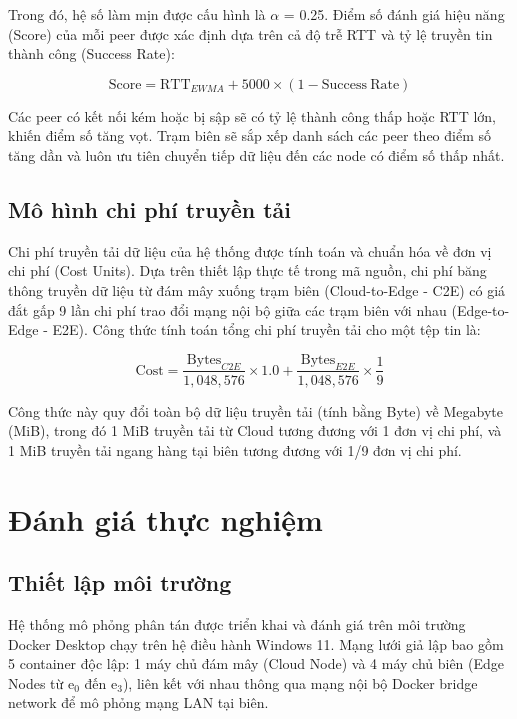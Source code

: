 \documentclass[11pt,a4paper]{article}
\begin{document}
Trong đó, hệ số làm mịn được cấu hình là \ensuremath{\alpha} = 0.25. Điểm số đánh giá hiệu năng (Score) của mỗi peer được xác định dựa trên cả độ trễ RTT và tỷ lệ truyền tin thành công (Success Rate):

\[\mathrm{Score}=\mathrm{RTT}_{EWMA}+5000\times(1-\mathrm{Success\ Rate})\]

Các peer có kết nối kém hoặc bị sập sẽ có tỷ lệ thành công thấp hoặc RTT lớn, khiến điểm số tăng vọt. Trạm biên sẽ sắp xếp danh sách các peer theo điểm số tăng dần và luôn ưu tiên chuyển tiếp dữ liệu đến các node có điểm số thấp nhất.

\subsection{Mô hình chi phí truyền tải}

Chi phí truyền tải dữ liệu của hệ thống được tính toán và chuẩn hóa về đơn vị chi phí (Cost Units). Dựa trên thiết lập thực tế trong mã nguồn, chi phí băng thông truyền dữ liệu từ đám mây xuống trạm biên (Cloud-to-Edge - C2E) có giá đắt gấp 9 lần chi phí trao đổi mạng nội bộ giữa các trạm biên với nhau (Edge-to-Edge - E2E). Công thức tính toán tổng chi phí truyền tải cho một tệp tin là:

\[\mathrm{Cost}=\frac{\mathrm{Bytes}_{C2E}}{1{,}048{,}576}\times1.0+\frac{\mathrm{Bytes}_{E2E}}{1{,}048{,}576}\times\frac{1}{9}\]

Công thức này quy đổi toàn bộ dữ liệu truyền tải (tính bằng Byte) về Megabyte (MiB), trong đó 1 MiB truyền tải từ Cloud tương đương với 1 đơn vị chi phí, và 1 MiB truyền tải ngang hàng tại biên tương đương với 1/9 đơn vị chi phí.

\section{Đánh giá thực nghiệm}

\subsection{Thiết lập môi trường}

Hệ thống mô phỏng phân tán được triển khai và đánh giá trên môi trường Docker Desktop chạy trên hệ điều hành Windows 11. Mạng lưới giả lập bao gồm 5 container độc lập: 1 máy chủ đám mây (Cloud Node) và 4 máy chủ biên (Edge Nodes từ e\ensuremath{_0} đến e\ensuremath{_3}), liên kết với nhau thông qua mạng nội bộ Docker bridge network để mô phỏng mạng LAN tại biên.
\end{document}
